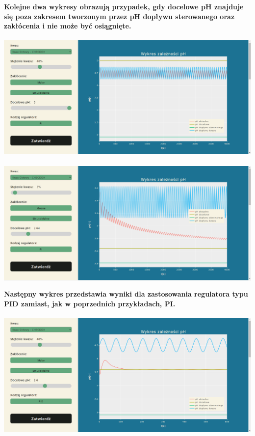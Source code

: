 \documentclass[polish,polish,a4paper,12pt]{article}
\begin{document}
	\begin{center}
		\textbf{Kolejne dwa wykresy obrazują przypadek, gdy docelowe pH znajduje się poza zakresem tworzonym przez pH dopływu sterowanego oraz zakłócenia i nie może być osiągnięte.}\\
		\hspace{0em}\\
		\includegraphics[scale=0.4]{octowy_48_5}\\
		\hspace{0em}\\
		\includegraphics[scale=0.4]{octowy_5_2_64}
	\end{center}
	\newpage
	\begin{center}
		\textbf{Następny wykres przedstawia wyniki dla zastosowania regulatora typu PID zamiast, jak w poprzednich przykładach, PI.}\\
		\hspace{0em}\\
		\includegraphics[scale=0.4]{octowy_48_3_6_pid}
	\end{center}
\end{document}
